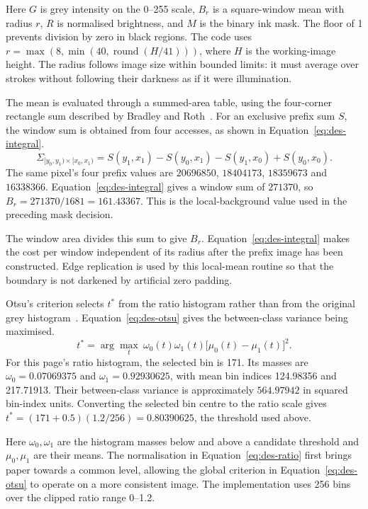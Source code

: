 Here $G$ is grey intensity on the 0--255 scale, $B_r$ is a square-window mean with radius $r$, $R$ is normalised brightness, and $M$ is the binary ink mask. The floor of 1 prevents division by zero in black regions. The code uses $r=\max(8,\min(40,\operatorname{round}(H/41)))$, where $H$ is the working-image height. The radius follows image size within bounded limits: it must average over strokes without following their darkness as if it were illumination.

The mean is evaluated through a summed-area table, using the four-corner rectangle sum described by Bradley and Roth~\cite[p.~2]{bradley2007}. For an exclusive prefix sum $S$, the window sum is obtained from four accesses, as shown in Equation~\ref{eq:des-integral}.
\begin{equation}
\Sigma_{[y_0,y_1)\times[x_0,x_1)}=
S(y_1,x_1)-S(y_0,x_1)-S(y_1,x_0)+S(y_0,x_0).
\label{eq:des-integral}
\end{equation}
The same pixel's four prefix values are $20696850$, $18404173$, $18359673$ and $16338366$. Equation~\ref{eq:des-integral} gives a window sum of $271370$, so $B_r=271370/1681=161.43367$. This is the local-background value used in the preceding mask decision.

The window area divides this sum to give $B_r$. Equation~\ref{eq:des-integral} makes the cost per window independent of its radius after the prefix image has been constructed. Edge replication is used by this local-mean routine so that the boundary is not darkened by artificial zero padding.

Otsu's criterion selects $t^*$ from the ratio histogram rather than from the original grey histogram~\cite{otsu1979}. Equation~\ref{eq:des-otsu} gives the between-class variance being maximised.
\begin{equation}
t^*=\arg\max_t\ \omega_0(t)\omega_1(t)
\bigl[\mu_0(t)-\mu_1(t)\bigr]^2.
\label{eq:des-otsu}
\end{equation}
For this page's ratio histogram, the selected bin is 171. Its masses are $\omega_0=0.07069375$ and $\omega_1=0.92930625$, with mean bin indices 124.98356 and 217.71913. Their between-class variance is approximately $564.97942$ in squared bin-index units. Converting the selected bin centre to the ratio scale gives $t^*=(171+0.5)(1.2/256)=0.80390625$, the threshold used above.

Here $\omega_0,\omega_1$ are the histogram masses below and above a candidate threshold and $\mu_0,\mu_1$ are their means. The normalisation in Equation~\ref{eq:des-ratio} first brings paper towards a common level, allowing the global criterion in Equation~\ref{eq:des-otsu} to operate on a more consistent image. The implementation uses 256 bins over the clipped ratio range 0--1.2.

